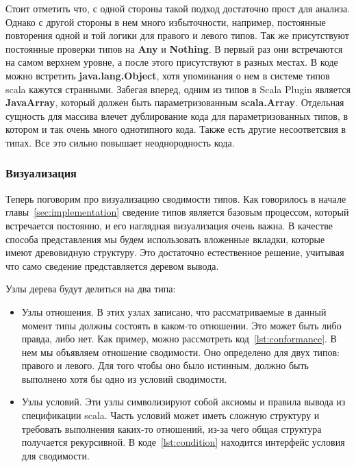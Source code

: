 Стоит отметить что, с одной стороны такой подход достаточно прост для анализа.
Однако с другой стороны в нем много избыточности, например, постоянные повторения
одной и той логики для правого и левого типов.
Так же присутствуют постоянные проверки типов на \textbf{Any} и \textbf{Nothing}.
В первый раз они встречаются на самом верхнем уровне, а после этого
присутствуют в разных местах.
В коде можно встретить \textbf{java.lang.Object}, хотя упоминания о
нем в системе типов scala кажутся странными.
Забегая вперед, одним из типов в Scala Plugin является \textbf{JavaArray},
который должен быть параметризованным \textbf{scala.Array}.
Отдельная сущность для массива влечет дублирование кода для параметризованных
типов, в котором и так очень много однотипного кода.
Также есть другие несоответсвия в типах.
Все это сильно повышает неоднородность кода.

\subsubsection{Визуализация}

Теперь поговорим про визуализацию сводимости типов.
Как говорилось в начале главы~\ref{sec:implementation} сведение типов является
базовым процессом, который встречается постоянно, и его наглядная визуализация
очень важна.
В качестве способа представления мы будем использовать вложенные вкладки,
которые имеют древовидную структуру.
Это достаточно естественное решение, учитывая что само сведение
представляется деревом вывода.

Узлы дерева будут делиться на два типа:
\begin{itemize}
  \item Узлы отношения.
  В этих узлах записано, что рассматриваемые в данный момент
  типы должны состоять в каком-то отношении.
  Это может быть либо правда, либо нет.
  Как пример, можно рассмотреть код~\ref{lst:conformance}.
  В нем мы объявляем отношение сводимости. Оно определено для двух типов:
  правого и левого.
  Для того чтобы оно было истинным, должно быть выполнено хотя бы одно из
  условий сводимости.
  \item Узлы условий.
  Эти узлы символизируют собой аксиомы и правила вывода из спецификации
  scala.
  Часть условий может иметь сложную структуру и требовать выполнения каких-то
  отношений, из-за чего общая структура получается рекурсивной.
  В коде~\ref{lst:condition} находится интерфейс условия для сводимости.
\end{itemize}



